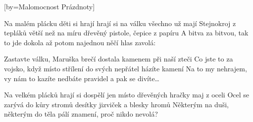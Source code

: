 [by={Malomocnost Prázdnoty}]

\beginverse{}
Na malém plácku děti si hrají
hrají si na válku všechno už mají
Stejnokroj z tepláků větší než na míru
dřevěný pistole, čepice z papíru
A bitva za bitvou, tak to jde dokola
až potom najednou něčí hlas zavolá:
\endverse{}

\beginchorus{}
Zastavte válku, Maruška brečí
dostala kamenem při naší zteči
Co jste to za vojsko, když místo střílení
do svých nepřátel házíte kamení
Na to my nehrajem, vy nám to kazíte
nedbáte pravidel a pak se divíte\ldots{}
\endchorus{}

\beginverse{}
Na velkém plácků hrají si dospělí
jen místo dřevěných hračky maj z oceli
Ocel se zarývá do kůry stromů
desítky jizviček a blesky hromů
Některým na duši, některým do těla
pálí znamení, proč nikdo nevolá?
\endverse{}

\beginchorus{}
\phantom{}
\endchorus{}

\endsong{}
